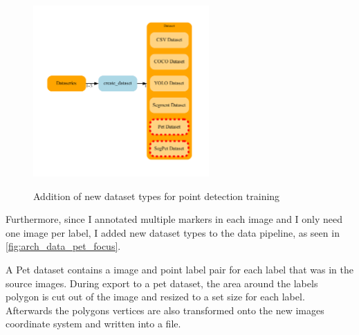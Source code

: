 \documentclass[10pt]{book}
\begin{document}
\begin{figure}
  \caption{Addition of new dataset types for point detection training}
  \includegraphics[width=0.6\textwidth]{graph/arch_data_pet_focus}
  \label{fig:arch_data_pet_focus}
\end{figure}

Furthermore, since I annotated multiple markers in each image and I only need one image per label, I added new dataset types to the data pipeline, as seen in \autoref{fig:arch_data_pet_focus}. 

A Pet dataset contains a image and point label pair for each label that was in the source images. During export to a pet dataset, the area around the labels polygon is cut out of the image and resized to a set size for each label. Afterwards the polygons vertices are also transformed onto the new images coordinate system and written into a file. 
\end{document}
